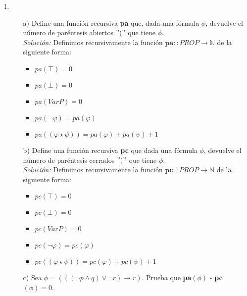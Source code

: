 \documentclass[letterpaper,10pt]{article}
\begin{document}
\begin{enumerate}
        \item 
        \begin{itemize}
            \item [a)] Define una función recursiva \textbf{pa} que, dada una 
            fórmula $\phi$, devuelve el número de paréntesis abiertos $"("$ que
            tiene $\phi$. \\
            \textit{Solución:} Definimos recursivamente la función 
            $\textbf{pa} :: PROP \rightarrow \mathbb{N}$ de la siguiente forma:

            \begin{itemize}
                \item $pa (\top) = 0$
                \item $pa (\bot) = 0$
                \item $pa (Var P) = 0$
                \item $pa (\neg \varphi) = pa (\varphi)$
                \item $pa ((\varphi \star \psi)) = pa(\varphi) + pa(\psi) + 1$
            \end{itemize}

            \item[b)] Define una función recursiva \textbf{pc} que dada una 
            fórmula $\phi$, devuelve el número de paréntesis cerrados $")"$ que
            tiene $\phi$. \\
            \textit{Solución:} Definimos recursivamente la función 
            $\textbf{pc} :: PROP \rightarrow \mathbb{N}$ de la siguiente forma:

            \begin{itemize}
                \item $pc (\top) = 0$
                \item $pc (\bot) = 0$
                \item $pc (Var P) = 0$
                \item $pc (\neg \varphi) = pc (\varphi)$
                \item $pc ((\varphi \star \psi)) = pc (\varphi) + pc (\psi) + 1$
            \end{itemize}
            
            \item[c)] Sea $\phi = ((( \neg p \land q) \lor \neg r) 
            \rightarrow r)$. Prueba que 
            \textbf{pa}$(\phi)$ - \textbf{pc}$(\phi) = 0$.


\end{itemize}
\end{enumerate}
\end{document}
